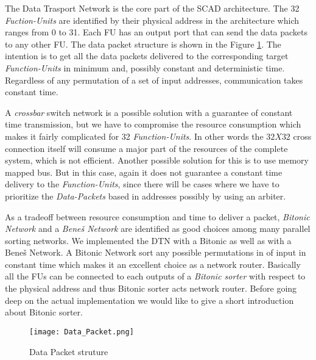 		
		
		The Data Trasport Network is the core part of the SCAD architecture. The 32 \textit{Fuction-Units} are identified by their physical address in the architecture which ranges from 0 to 31. Each FU has an output port 
		that can send the data packets to any other FU. The data packet structure is shown in the Figure \ref{fig:Data_Packet}. The intention is to get all the data packets
		delivered to the corresponding target \textit{Function-Units} in minimum and, possibly constant and deterministic time. Regardless of any permutation of a set of input addresses, communication takes constant time.
		
		A \textit{crossbar} switch network is a possible solution with a guarantee of constant time transmission, but we have to compromise the resource consumption which makes it fairly complicated 
		for 32 \textit{Function-Units}. In other words the $32 X 32$ cross connection itself will consume a major part of the resources of the complete system, which is not efficient. Another possible solution for this is to use 
		memory mapped bus. But in this case, again it does not guarantee a constant time delivery to the \textit{Function-Units}, since there will be cases where we have to prioritize the \textit{Data-Packets} based in addresses possibly 
		by using an arbiter. 
		
		As a tradeoff between resource consumption and time to deliver a packet, \emph{Bitonic Network} and a \emph{Beneš Network} are identified as good choices among many parallel sorting networks. 
		We implemented the DTN with a Bitonic as well as with a Beneš Network. A {Bitonic Network} sort any possible permutations in of input in constant time which makes it an excellent choice as a network router.
		Basically all the FUs can be connected to each outputs of a \textit{Bitonic sorter} with respect to the physical address and thus {Bitonic sorter} acts network router. 
		Before going deep on the actual implementation we would like to give a short introduction about {Bitonic sorter}.

			\begin{figure}[!ht]
				\texttt{[image: Data\_Packet.png]}
				\caption{Data Packet struture}
			\label{fig:Data_Packet}
			\end{figure}

